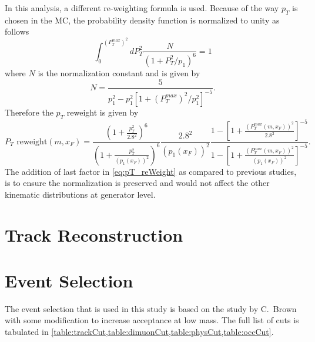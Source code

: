 \documentclass[../main.tex]{subfiles}
\begin{document}
In this analysis, a different re-weighting formula is used. Because of the way $p_T$ is chosen
in the MC, the probability density function is normalized to unity as follows
\begin{equation}
	\int^{\left(P_T^{max}\right)^2}_0 dP_T^2 \frac{N}{\left(1+ P_T^2/p_1\right)^6}=1
\end{equation}
where $N$ is the normalization constant and is given by
\begin{equation}
	N=\frac{5}{p_1^2-p_1^2\left[ 1+ \left(P_T^{max}\right)^2/p_1^2\right]^{-5}}.
\end{equation}
Therefore the $p_T$ reweight is given by
\begin{equation}
	P_T \textrm{ reweight}\left(m,x_F\right)=
	\frac{\left(1 + \frac{p_T^2}{2.8^2} \right)^6}{\left(1 + \frac{p_T^2}{\left(p_1\left(x_F\right)\right)^2} \right)^6} \frac{2.8^2}{\left(p_1\left(x_F\right)\right)^2}\frac{1-\left[ 1+ \frac{\left(P_T^{max}\left(m,x_F\right)\right)^2}{2.8^2}\right]^{-5}}{1-\left[ 1+ \frac{\left(P_T^{max}\left(m,x_F\right)\right)^2}{\left(p_1\left(x_F\right)\right)^2}\right]^{-5}}.
	\label{eq:pT_reWeight}
\end{equation}
The addition of last factor in \cref{eq:pT_reWeight} as compared to previous studies,
is to ensure the normalization is preserved and would not affect the other kinematic
distributions at generator level.


\section{Track Reconstruction}

\section{Event Selection}
The event selection that is used in this study is based on the study by C.~Brown
\cite{chuck-2111} with some modification to increase acceptance at low mass. The
full list of cuts is tabulated in \cref{table:trackCut,table:dimuonCut,table:physCut,table:occCut}.
\end{document}
